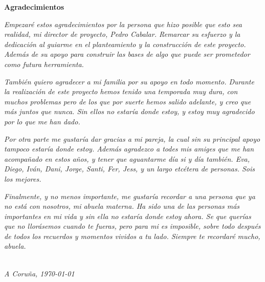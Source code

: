 \vspace*{4em}

{\Huge\bfseries{Agradecimientos}\par}

\vspace*{2em}

\textit{Empezaré estos agradecimientos por la persona que hizo posible que esto sea realidad, mi director de proyecto, Pedro Cabalar. Remarcar su esfuerzo y la dedicación al guiarme en el planteamiento y la construcción de este proyecto. Además de su apoyo para construir las bases de algo que puede ser prometedor como futura herramienta.}\par

\vspace*{1em}

\textit{También quiero agradecer a mi familia por su apoyo en todo momento. Durante la realización de este proyecto hemos tenido una temporada muy dura, con muchos problemas pero de los que por suerte hemos salido adelante, y creo que más juntos que nunca. Sin ellos no estaría donde estoy, y estoy muy agradecido por lo que me han dado.}\par

\vspace*{1em}

\textit{Por otra parte me gustaría dar gracias a mi pareja, la cual sin su principal apoyo tampoco estaría donde estoy. Además agradezco a todes mis amiges que me han acompañado en estos años, y tener que aguantarme día si y día también. Eva, Diego, Iván, Dani, Jorge, Santi, Fer, Jess, y un largo etcétera de personas. Sois los mejores.}\par

\vspace*{1em}

\textit{Finalmente, y no menos importante, me gustaría recordar a una persona que ya no está con nosotros, mi abuela materna. Ha sido una de las personas más importantes en mi vida y sin ella no estaría donde estoy ahora. Se que querías que no llorásemos cuando te fueras, pero para mi es imposible, sobre todo después de todos los recuerdos y momentos vividos a tu lado. Siempre te recordaré mucho, abuela.}\par

\vspace*{\fill}

\begin{flushright}
	\authors \\
	\textit{A Coruña, \today}
\end{flushright}